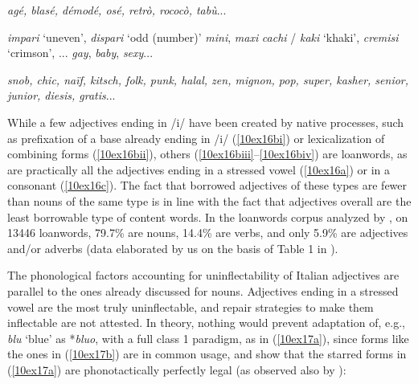 \documentclass[output=paper,colorlinks,citecolor=brown]{langscibook}
\begin{document}
\begin{exe}
	\ex \label{10ex16}
	\begin{xlist}
		\ex \label{10ex16a} \emph{agé, blasé, démodé, osé, retrò, rococò, tabù}...
		
		\ex \label{10ex16b}
		\begin{xlist}
			\ex \label{10ex16bi} \emph{impari} ‘uneven’, \emph{dispari} ‘odd (number)’
			\ex \label{10ex16bii} \emph{mini}, \emph{maxi}
			\ex \label{10ex16biii} \emph{cachi} / \emph{kaki} ‘khaki’, \emph{cremisi} ‘crimson’, ...
			\ex \label{10ex16biv} \emph{gay}, \emph{baby}, \emph{sexy}...
		\end{xlist}
		
		\ex \label{10ex16c} \emph{snob, chic, naïf, kitsch, folk, punk, halal, zen, mignon, pop, super, kasher, senior, junior, diesis, gratis}...
	\end{xlist}
\end{exe}

While a few adjectives ending in /i/ have been created by native processes, such as prefixation of a base already ending in /i/ (\ref{10ex16bi}) or lexicalization of combining forms (\ref{10ex16bii}), others (\ref{10ex16biii}--\ref{10ex16biv}) are loanwords, as are practically all the adjectives ending in a stressed vowel (\ref{10ex16a}) or in a consonant (\ref{10ex16c}). The fact that borrowed adjectives of these types are fewer than nouns of the same type is in line with the fact that adjectives overall are the least borrowable type of content words. In the loanwords corpus analyzed by \citet{tadmorhaspelmathtaylor2010}, on 13446 loanwords, 79.7\% are nouns, 14.4\% are verbs, and only 5.9\% are adjectives and/or adverbs (data elaborated by us on the basis of Table 1 in \citealt[231]{tadmorhaspelmathtaylor2010}).

{\sloppy The phonological factors accounting for uninflectability of Italian adjectives are parallel to the ones already discussed for nouns. Adjectives ending in a stressed vowel are the most truly uninflectable, and repair strategies to make them inflectable are not attested. In theory, nothing would prevent adaptation of, e.g., \emph{blu} `blue' as *\emph{bluo}, with a full class 1 paradigm, as in (\ref{10ex17a}), since forms like the ones in (\ref{10ex17b}) are in common usage, and show that the starred forms in (\ref{10ex17a}) are phonotactically perfectly legal (as observed also by \citealt[308]{fedden2019}):\par}
\end{document}
